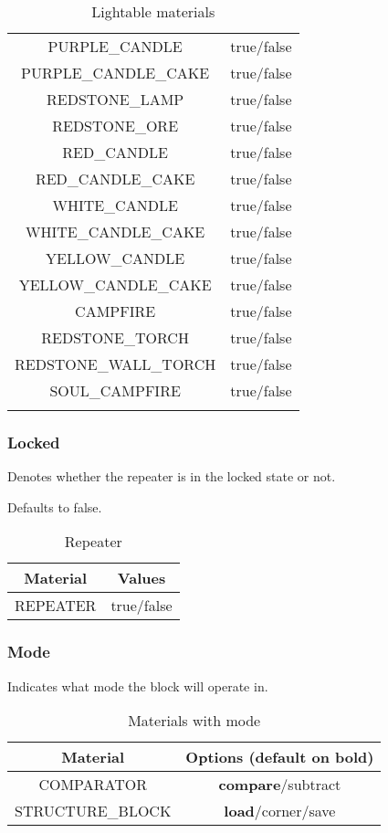 \begin{longtable}{ |c|c| }
	PURPLE\_CANDLE & true/false \\
	PURPLE\_CANDLE\_CAKE & true/false \\
	REDSTONE\_LAMP & true/false \\
	REDSTONE\_ORE & true/false \\
	RED\_CANDLE & true/false \\
	RED\_CANDLE\_CAKE & true/false \\
	WHITE\_CANDLE & true/false \\
	WHITE\_CANDLE\_CAKE & true/false \\
	YELLOW\_CANDLE & true/false \\
	YELLOW\_CANDLE\_CAKE & true/false \\
	\hline
	CAMPFIRE & true/false \\
	REDSTONE\_TORCH & true/false \\
	REDSTONE\_WALL\_TORCH & true/false \\
	SOUL\_CAMPFIRE & true/false \\
	\hline
	\caption{Lightable materials}
\end{longtable}


\subsubsection{Locked}
Denotes whether the repeater is in the locked state or not.

Defaults to false.

\begin{table}[H]
	\centering
	\begin{tabular}{ |c|c| }
		\hline
		Material & Values \\
		\hline
		REPEATER & true/false \\
		\hline
	\end{tabular}
	\caption{Repeater}
\end{table}

\subsubsection{Mode}
Indicates what mode the block will operate in.

\begin{table}[H]
	\centering
	\begin{tabular}{ |c|c| }
		\hline
		Material & Options (default on bold) \\
		\hline
		COMPARATOR & \textbf{compare}/subtract \\
		STRUCTURE\_BLOCK & \textbf{load}/corner/save \\
		\hline
	\end{tabular}
	\caption{Materials with mode}
\end{table}

